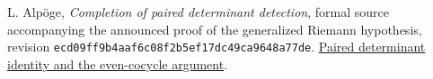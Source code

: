 L. Alp\"oge, \emph{Completion of paired determinant detection},
formal source accompanying the announced proof of the generalized
Riemann hypothesis, revision
\texttt{ecd09ff9b4aaf6c08f2b5ef17dc49ca9648a77de}.
\href{https://github.com/jsmorph/rh/blob/ecd09ff9b4aaf6c08f2b5ef17dc49ca9648a77de/lean/src/Development/AutomorphicArithmetic/AutomorphicVarieties/PatchingModules/DeterminantPadicFree/DetAlg.lean}{Paired determinant identity and the even-cocycle argument}.
